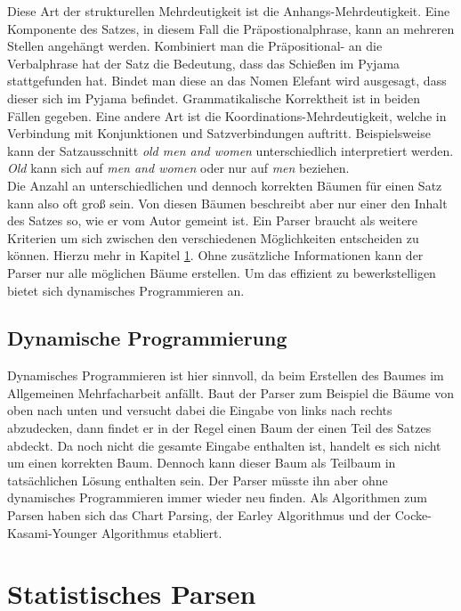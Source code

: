 Diese Art der strukturellen Mehrdeutigkeit ist die Anhangs-Mehrdeutigkeit. Eine Komponente des Satzes, in diesem Fall die Präpostionalphrase, kann an mehreren Stellen angehängt werden. Kombiniert man die Präpositional- an die Verbalphrase hat der Satz die Bedeutung, dass das Schießen im Pyjama stattgefunden hat. Bindet man diese an das Nomen Elefant wird ausgesagt, dass dieser sich im Pyjama befindet. Grammatikalische Korrektheit ist in beiden Fällen gegeben. Eine andere Art ist die Koordinations-Mehrdeutigkeit, welche in Verbindung mit Konjunktionen und Satzverbindungen auftritt. Beispielsweise kann der Satzausschnitt \textit{old men and women} unterschiedlich interpretiert werden. \textit{Old} kann sich auf \textit{men and women} oder nur auf \textit{men} beziehen. \\
Die Anzahl an unterschiedlichen und dennoch korrekten Bäumen für einen Satz kann also oft groß sein. %
Von diesen Bäumen beschreibt aber nur einer den Inhalt des Satzes so, wie er vom Autor gemeint ist. Ein Parser braucht als weitere Kriterien um sich zwischen den verschiedenen Möglichkeiten entscheiden zu können. Hierzu mehr in Kapitel \ref{sec:nlp:stat-parsen}. Ohne zusätzliche Informationen kann der Parser nur alle möglichen Bäume erstellen. Um das effizient zu bewerkstelligen bietet sich dynamisches Programmieren an. 

\subsection{Dynamische Programmierung}
\label{sec:nlp:syn-parsen:dyn-progr}

Dynamisches Programmieren ist hier sinnvoll, da beim Erstellen des Baumes im Allgemeinen Mehrfacharbeit anfällt. Baut der Parser zum Beispiel die Bäume von oben nach unten und versucht dabei die Eingabe von links nach rechts abzudecken, dann findet er in der Regel einen Baum der einen Teil des Satzes abdeckt. Da noch nicht die gesamte Eingabe enthalten ist, handelt es sich nicht um einen korrekten Baum. Dennoch kann dieser Baum als Teilbaum in tatsächlichen Lösung enthalten sein. Der Parser müsste ihn aber ohne dynamisches Programmieren immer wieder neu finden. Als Algorithmen zum Parsen haben sich das Chart Parsing, der Earley Algorithmus und der Cocke-Kasami-Younger Algorithmus etabliert.

\section{Statistisches Parsen}
\label{sec:nlp:stat-parsen}

